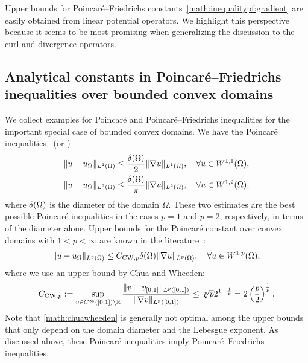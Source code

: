 \documentclass[10pt,a4paper]{article}
\begin{document}
\begin{remark}
    Upper bounds for Poincar\'e--Friedrichs constants~\eqref{math:inequalitypf:gradient} are easily obtained from linear potential operators. 
    We highlight this perspective because it seems to be most promising when generalizing the discussion to the curl and divergence operators. 
\end{remark}




\subsection{Analytical constants in Poincar\'e--Friedrichs inequalities over bounded convex domains} \label{subsection: PX_convex}

We collect examples for Poincar\'e and Poincar\'e--Friedrichs inequalities for the important special case of bounded convex domains. 
We have the Poincar\'e inequalities~\cite{Pay_Wei_Poin_conv_60,bebendorf2003note,acosta2004optimal} (or \cite[Lemma~3.24]{ern2021finite}) 
\begin{align}\label{math:acostaduran}
    \| u - u_{\Omega} \|_{L^{1}(\Omega)}
    \leq 
    \frac{{\delta}(\Omega)}{2}
    \| \nabla u \|_{L^{1}(\Omega)}
    ,
    \quad 
    \forall 
    u \in W^{1,1}(\Omega)
    ,
    \\
    \| u - u_{\Omega} \|_{L^{2}(\Omega)} \label{math:bebendorf}
    \leq 
    \frac{{\delta}(\Omega)}{\pi}
    \| \nabla u \|_{L^{2}(\Omega)}
    ,
    \quad 
    \forall 
    u \in W^{1,2}(\Omega)
    ,
\end{align}
where ${\delta}(\Omega)$ is the diameter of the domain $\Omega$.
These two estimates are the best possible Poincar\'e inequalities in the cases $p=1$ and $p=2$, respectively, in terms of the diameter alone. 
Upper bounds for the Poincar\'e constant over convex domains with $1 < p < \infty$ are known in the literature~\cite[Theorem~1.1, Theorem~1.2]{chua2006estimates}:
\begin{align}\label{math:chuawheeden}
    \| u - u_{\Omega} \|_{L^{p}(\Omega)}
    \leq 
    C_{{\rm CW},p}
    {\delta}(\Omega)
    \| \nabla u \|_{L^{p}(\Omega)}
    ,
    \quad 
    \forall 
    u \in W^{1,p}(\Omega)
    ,
\end{align}
where we use an upper bound by Chua and Wheeden:
\begin{align*}
    C_{{\rm CW},p} 
    := 
    \sup\limits_{ v \in C^\infty([0,1]) \setminus {\mathbb R} } 
    \frac{ 
        \| v - v_{[0,1]} \|_{L^{p}([0,1])} 
    }{ 
        \| \nabla v \|_{L^{p}([0,1])} 
    }
    \leq 
    \sqrt[p]{p} 2^{1-\frac 1 p}
    =
    2
    \left( \frac p 2 \right)^{\frac 1 p}
    .
\end{align*} 
Note that \eqref{math:chuawheeden} is generally not optimal among the upper bounds that only depend on the domain diameter and the Lebesgue exponent.
As discussed above, these Poincar\'e inequalities imply Poincar\'e--Friedrichs inequalities. 
\end{document}
